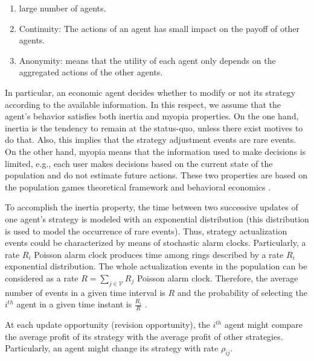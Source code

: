 \documentclass[a4paper,10pt]{article}
\def\th{^{th}}
\def\th{^{th}}
\begin{document}
\begin{enumerate}
\item large number of agents.
\item Continuity: The actions of an agent has small impact on the payoff of other agents.
\item Anonymity: means that the utility of each agent only depends on the aggregated actions of the other agents.
\end{enumerate}



In particular, an economic agent decides whether to modify or not its strategy according to the available information. In this respect, we assume that the agent's behavior satisfies both inertia and myopia properties. On the one hand, inertia 
is the tendency to remain at the status-quo, unless there exist motives to do that.
Also, this implies that the strategy adjustment events are rare events.
On the other hand, myopia means that the information used to make decisions is limited, e.g., each user makes decisions based on the current state of the population and do not estimate future actions. These two properties are based on the population games theoretical framework \cite{sandholm_book}
and behavioral economics \cite{gal}.

To accomplish the inertia property, the time between two successive updates of one 
agent's strategy is modeled with an exponential distribution (this distribution is used to model the occurrence of rare events). 
Thus, strategy actualization events could be characterized by means of stochastic alarm clocks.
Particularly, a rate $R_i$ Poisson alarm clock produces time among rings described by
a rate $R_i$ exponential distribution.
The whole actualization events in the population can be considered as a rate $R=\sum_{j\in \mathcal{V}} R_j$ Poisson alarm clock.
Therefore, the average number of events in a given time interval is $R$ and the probability of selecting the $i^{th}$
agent in a given time instant is
 $\frac{R_i}{R}$ \cite{sandholm_book}.

At each update opportunity (revision opportunity), the $i\th$ agent might compare the average profit of its strategy with the average profit of other strategies. Particularly, an agent might change its strategy with rate $\rho_{ij}$.
 
\end{document}
